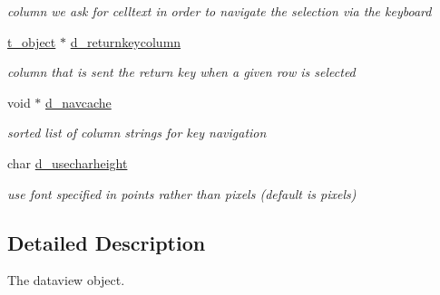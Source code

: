 \begin{DoxyCompactItemize}
\begin{DoxyCompactList}\small\item\em column we ask for celltext in order to navigate the selection via the keyboard \item\end{DoxyCompactList}\item 
\hypertarget{structt__jdataview_ab7b3dc20f27b24591307de643b57d260}{
\hyperlink{structt__object}{t\_\-object} $\ast$ \hyperlink{structt__jdataview_ab7b3dc20f27b24591307de643b57d260}{d\_\-returnkeycolumn}}
\label{structt__jdataview_ab7b3dc20f27b24591307de643b57d260}

\begin{DoxyCompactList}\small\item\em column that is sent the return key when a given row is selected \item\end{DoxyCompactList}\item 
\hypertarget{structt__jdataview_aaea7e47f03501129f1456c51c10e5993}{
void $\ast$ \hyperlink{structt__jdataview_aaea7e47f03501129f1456c51c10e5993}{d\_\-navcache}}
\label{structt__jdataview_aaea7e47f03501129f1456c51c10e5993}

\begin{DoxyCompactList}\small\item\em sorted list of column strings for key navigation \item\end{DoxyCompactList}\item 
\hypertarget{structt__jdataview_a0dc3799170e5824b503dd53d64f2f4dc}{
char \hyperlink{structt__jdataview_a0dc3799170e5824b503dd53d64f2f4dc}{d\_\-usecharheight}}
\label{structt__jdataview_a0dc3799170e5824b503dd53d64f2f4dc}

\begin{DoxyCompactList}\small\item\em use font specified in points rather than pixels (default is pixels) \item\end{DoxyCompactList}\end{DoxyCompactItemize}


\subsection{Detailed Description}
The dataview object. 